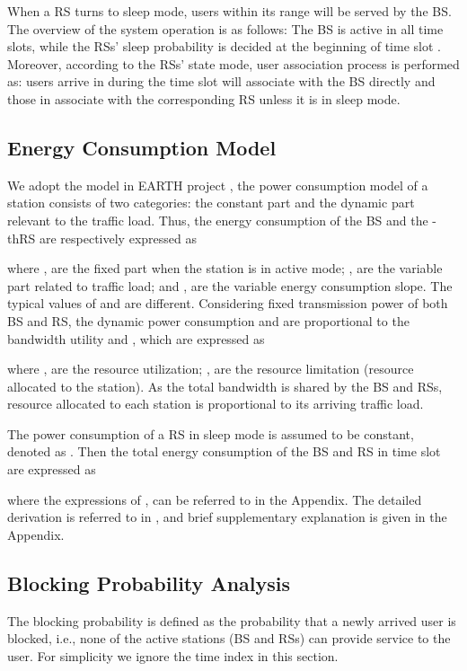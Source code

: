 \documentclass[conference]{IEEEtran}
\begin{document}
 When a RS turns to sleep mode, users within its range will be served by the BS. The overview of the system operation is as follows: The BS is active in all time slots, while the RSs' sleep probability  is decided at the beginning of time slot . Moreover, according to the RSs' state mode, user association process is performed as: users arrive in  during the time slot will associate with the BS directly and those in  associate with the corresponding RS unless it is in sleep mode.

 \subsection{Energy Consumption Model}
 We adopt the model in EARTH project \cite{Muhammad2012Energy}, the power consumption model of a station consists of two categories: the constant part and the dynamic part relevant to the traffic load. Thus, the energy consumption of the BS and the -thRS are respectively expressed as
 
where ,  are the fixed part when the station is in active mode; ,  are the variable part related to traffic load; and ,  are the variable energy consumption slope. The typical values of  and  are different. Considering fixed transmission power of both BS and RS, the dynamic power consumption  and  are proportional to the bandwidth utility  and , which are expressed as
 
where ,  are the resource utilization; ,  are the resource limitation (resource allocated to the station). As the total bandwidth is shared by the BS and RSs, resource allocated to each station is proportional to its arriving traffic load.

 The power consumption of a RS in sleep mode is assumed to be constant, denoted as . Then the total energy consumption of the BS and RS in time slot  are expressed as
 
 
 where the expressions of ,  can be referred to in the Appendix. The detailed derivation is referred to in \cite{Jie2012Adynamic}, and brief supplementary explanation is given in the Appendix.

 \subsection{Blocking Probability Analysis}
 The blocking probability is defined as the probability that a newly arrived user is blocked, i.e., none of the active stations (BS and RSs) can provide service to the user. For simplicity we ignore the time index in this section.
\end{document}
